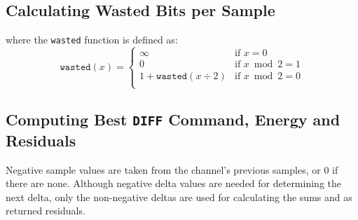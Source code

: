 \clearpage

\subsection{Calculating Wasted Bits per Sample}
\label{shorten:calculate_wasted_bps}

where the \texttt{wasted} function is defined as:
\begin{equation*}
  \texttt{wasted}(x) =
  \begin{cases}
    \infty & \text{if } x = 0 \\
    0 & \text{if } x \bmod 2 = 1 \\
    1 + \texttt{wasted}(x \div 2) & \text{if } x \bmod 2 = 0 \\
  \end{cases}
\end{equation*}

\clearpage

\subsection{Computing Best \texttt{DIFF} Command, Energy and Residuals}
\label{shorten:compute_best_diff}

\par
\noindent
Negative sample values are taken from the channel's previous samples,
or 0 if there are none.
Although negative delta values are needed for determining the next delta,
only the non-negative deltas are used for calculating the sums
and as returned residuals.

\clearpage

